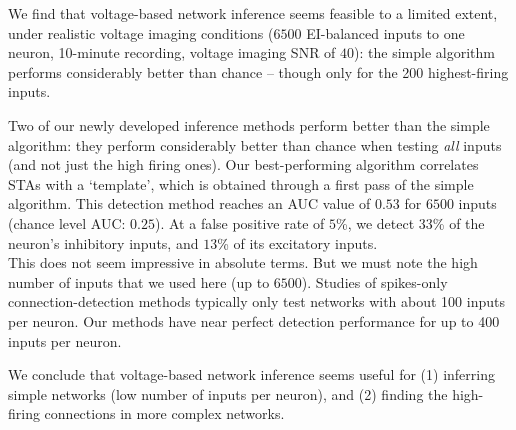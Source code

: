 We find that voltage-based network inference seems feasible to a limited extent, under realistic voltage imaging conditions ($6500$ EI-balanced inputs to one neuron, 10-minute
recording, voltage imaging SNR of $40$): the simple algorithm performs considerably better than chance -- though only for the 200 highest-firing inputs.

Two of our newly developed inference methods perform better than the simple algorithm: they perform considerably better than chance when testing \emph{all} inputs (and not just the high firing ones). Our best-performing algorithm correlates STAs with a `template', which is obtained through a first pass of the simple algorithm. This detection method reaches an AUC value of $0.53$ for $6500$ inputs (chance level AUC: $0.25$). At a false positive rate of $5$\%, we detect $33$\% of the neuron's inhibitory inputs, and $13$\% of its excitatory inputs.\\
This does not seem impressive in absolute terms. But we must note the high number of inputs that we used here (up to $6500$). Studies of spikes-only connection-detection methods typically only test networks with about 100 inputs per neuron.\cite{Ito2011ExtendingTransferEntropy,Guyon2014DesignFirstNeuronal}
Our methods have near perfect detection performance for up to 400 inputs per neuron.

We conclude that voltage-based network inference seems useful for (1) inferring simple networks (low number of inputs per neuron), and (2) finding the high-firing connections in more complex networks.
